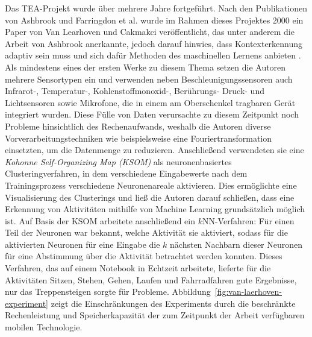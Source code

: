 Das TEA-Projekt wurde über mehrere Jahre fortgeführt. Nach den Publikationen von Ashbrook und Farringdon et al. wurde im Rahmen dieses Projektes 2000 ein Paper von Van Learhoven und Cakmakci veröffentlicht, das unter anderem die Arbeit von Ashbrook anerkannte, jedoch darauf hinwies, dass Kontexterkennung adaptiv sein muss und sich dafür Methoden des maschinellen Lernens anbieten \cite{VanLaerhoven2000}. Als mindestens eines der ersten Werke zu diesem Thema setzen die Autoren mehrere Sensortypen ein und verwenden neben Beschleunigungssensoren auch Infrarot-, Temperatur-, Kohlenstoffmonoxid-, Berührungs- Druck- und Lichtsensoren sowie Mikrofone, die in einem am Oberschenkel tragbaren Gerät integriert wurden. 
Diese Fülle von Daten verursachte zu diesem Zeitpunkt noch Probleme hinsichtlich des Rechenaufwands, weshalb die Autoren diverse Vorverarbeitungstechniken wie beispielsweise eine Fouriertransformation einsetzten, um die Datenmenge zu reduzieren. Anschließend verwendeten sie eine \textit{Kohonne Self-Organizing Map (KSOM)} als neuronenbasiertes Clusteringverfahren, in dem verschiedene Eingabewerte nach dem Trainingsprozess verschiedene Neuronenareale aktivieren. Dies ermöglichte eine Visualisierung des Clusterings und ließ die Autoren darauf schließen, dass eine Erkennung von Aktivitäten mithilfe von Machine Learning grundsätzlich möglich ist. Auf Basis der KSOM arbeitete anschließend ein $k$NN-Verfahren: Für einen Teil der Neuronen war bekannt, welche Aktivität sie aktiviert, sodass für die aktivierten Neuronen für eine Eingabe die $k$ nächsten Nachbarn dieser Neuronen für eine Abstimmung über die Aktivität betrachtet werden konnten. Dieses Verfahren, das auf einem Notebook in Echtzeit arbeitete, lieferte für die Aktivitäten Sitzen, Stehen, Gehen, Laufen und Fahrradfahren gute Ergebnisse, nur das Treppensteigen sorgte für Probleme. Abbildung~\ref{fig:van-laerhoven-experiment} zeigt die Einschränkungen des Experiments durch die beschränkte Rechenleistung und Speicherkapazität der zum Zeitpunkt der Arbeit verfügbaren mobilen Technologie.

